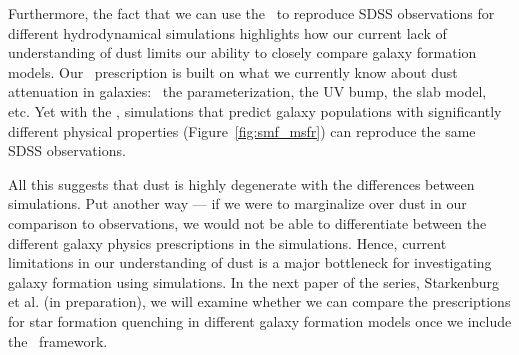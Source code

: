 Furthermore, the fact that we can use the \eda~to reproduce SDSS observations 
for different hydrodynamical simulations highlights how our current lack of 
understanding of dust limits our ability to closely compare galaxy
formation models. 
Our \eda~prescription is built on what we currently know about dust attenuation
in galaxies: \eg~the \citealt{noll2009} parameterization, the UV bump, the slab model, etc.
Yet with the \eda, simulations that predict galaxy populations with
significantly different physical properties (Figure~\ref{fig:smf_msfr}) can
reproduce the same SDSS observations. 

All this suggests that dust is highly degenerate with the differences between simulations. 
Put another way --- if we were to marginalize over dust in our comparison to
observations, we would not be able to differentiate between the different
galaxy physics prescriptions in the simulations. 
Hence, current limitations in our understanding of dust is a major bottleneck
for investigating galaxy formation using simulations.
In the next paper of the series, Starkenburg et al. (in preparation), we
will examine whether we can compare the prescriptions for star formation
quenching in different galaxy formation models once we include the
\eda~framework.


